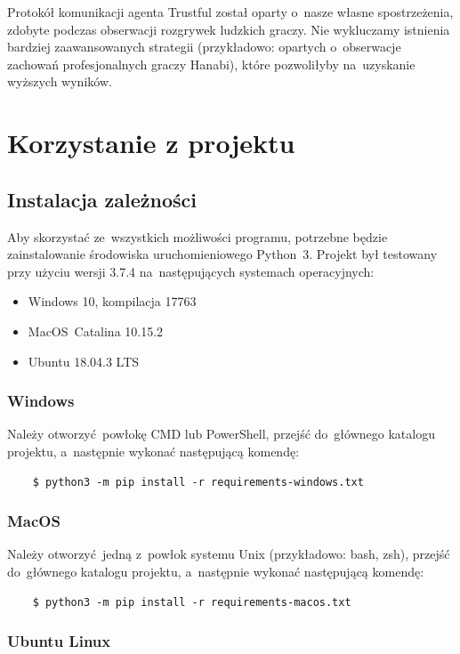 \documentclass[declaration,shortabstract,inz]{iithesis}
\begin{document}
Protokół komunikacji agenta Trustful został oparty o~nasze własne spostrzeżenia, zdobyte podczas obserwacji rozgrywek ludzkich graczy. Nie wykluczamy istnienia bardziej zaawansowanych strategii (przykładowo: opartych o~obserwacje zachowań profesjonalnych graczy Hanabi), które pozwoliłyby na~uzyskanie wyższych wyników.

\appendix
\chapter{Korzystanie z projektu}

\section{Instalacja zależności}
Aby skorzystać ze~wszystkich możliwości programu, potrzebne będzie zainstalowanie środowiska uruchomieniowego Python~3. Projekt był testowany przy użyciu wersji 3.7.4 na~następujących systemach operacyjnych:
\begin{itemize}
	\item Windows 10, kompilacja 17763
	\item MacOS~Catalina 10.15.2
	\item Ubuntu 18.04.3 LTS
\end{itemize}

\subsection{Windows}

Należy otworzyć powłokę CMD lub PowerShell, przejść do~głównego katalogu projektu, a~następnie wykonać następującą komendę:
\begin{verbatim}
    $ python3 -m pip install -r requirements-windows.txt
\end{verbatim}

\subsection{MacOS}

Należy otworzyć jedną z~powłok systemu Unix (przykładowo: bash, zsh), przejść do~głównego katalogu projektu, a~następnie wykonać następującą komendę:
\begin{verbatim}
    $ python3 -m pip install -r requirements-macos.txt
\end{verbatim}

\subsection{Ubuntu Linux}
\end{document}
